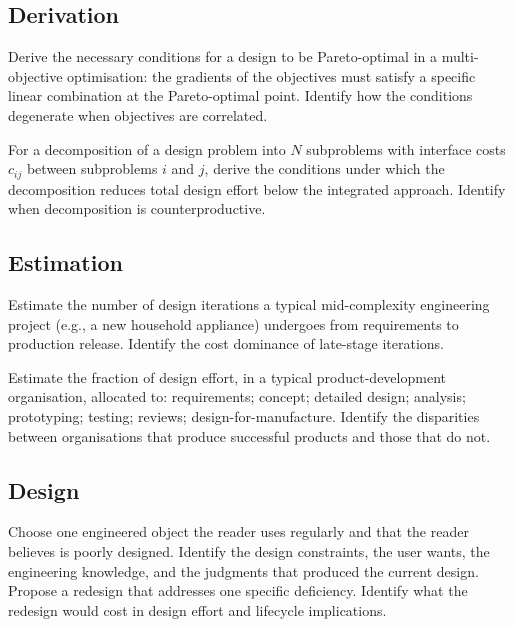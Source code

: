 \subsection*{Derivation}

\begin{exercise}
Derive the necessary conditions for a design to be Pareto-optimal in a multi-objective optimisation: the gradients of the objectives must satisfy a specific linear combination at the Pareto-optimal point. Identify how the conditions degenerate when objectives are correlated.
\end{exercise}

\begin{exercise}
For a decomposition of a design problem into $N$ subproblems with interface costs $c_{ij}$ between subproblems $i$ and $j$, derive the conditions under which the decomposition reduces total design effort below the integrated approach. Identify when decomposition is counterproductive.
\end{exercise}

\subsection*{Estimation}

\begin{exercise}
Estimate the number of design iterations a typical mid-complexity engineering project (e.g., a new household appliance) undergoes from requirements to production release. Identify the cost dominance of late-stage iterations.
\end{exercise}

\begin{exercise}
Estimate the fraction of design effort, in a typical product-development organisation, allocated to: requirements; concept; detailed design; analysis; prototyping; testing; reviews; design-for-manufacture. Identify the disparities between organisations that produce successful products and those that do not.
\end{exercise}

\subsection*{Design}

\begin{exercise}
Choose one engineered object the reader uses regularly and that the reader believes is poorly designed. Identify the design constraints, the user wants, the engineering knowledge, and the judgments that produced the current design. Propose a redesign that addresses one specific deficiency. Identify what the redesign would cost in design effort and lifecycle implications.
\end{exercise}

